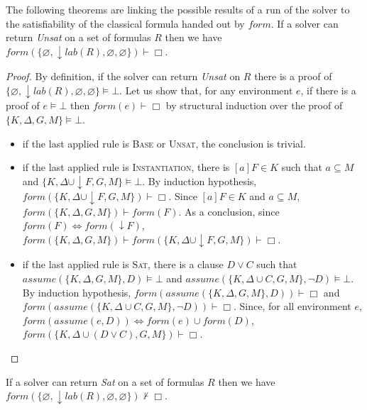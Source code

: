 \documentclass[a4paper,11pt]{article}
\newcommand{\F}{\mathit{form}}
\newcommand{\T}{\mathit{lab}}
\newcommand{\A}{\mathit{assume}}
\newcommand{\impbox}{\vDash\bot}
\begin{document}
The following theorems are linking the possible results of a run of the solver to the satisfiability
of the classical formula handed out by $\F$.
{\theorem\label{pred1} If a solver can return \emph{Unsat} on a set of formulas $R$ then we have
$\F(\{\varnothing,\downarrow\T(R),\varnothing,\varnothing\})\vdash\Box$.}
\begin{proof}
By definition, if the solver can return \emph{Unsat} on $R$ there is a proof of
$\{\varnothing,\downarrow\T(R),\varnothing,\varnothing\}\impbox$. Let us show that,
for any environment $e$, if there is a proof of $e\impbox$ then $\F(e)\vdash\Box$ by structural
induction over the proof of $\{K,\Delta,G,M\}\impbox$.
\begin{itemize}
 \item if the last applied rule is \textsc{Base} or \textsc{Unsat}, the conclusion is trivial.
 \item if the last applied rule is \textsc{Instantiation}, there is $[a]F\in K$ such that
$a\subseteq M$ and $\{K,\Delta\cup\downarrow F,G,M\}\impbox$. By induction hypothesis,
$\F(\{K,\Delta\cup\downarrow F,G,M\})\vdash\Box$. Since $[a]F\in K$ and $a\subseteq M$,
$\F(\{K,\Delta,G,M\})\vdash\F(F)$. As a conclusion, since $\F(F)\Leftrightarrow\F(\downarrow F)$,
$\F(\{K,\Delta,G,M\})\vdash\F(\{K,\Delta\cup\downarrow F,G,M\})\vdash\Box$.
 \item if the last applied rule is \textsc{Sat}, there is a clause $D\vee C$ such that
$\A(\{K,\Delta,G,M\},D)\impbox$ and $\A(\{K,\Delta\cup C,G,M\},\neg D)\impbox$.
By induction hypothesis, $\F(\A(\{K,\Delta,G,M\},D))\vdash\Box$ and
$\F(\A(\{K,\Delta\cup C,G,M\},\neg D))\vdash\Box$. Since, for all environment $e$,
$\F(\A(e,D))\Leftrightarrow\F(e)\cup\F(D)$,
$\F(\{K,\Delta\cup(D\vee C),G,M\})\vdash\Box$.
\end{itemize}
\end{proof}
{\theorem\label{pred2} If a solver can return \emph{Sat} on a set of formulas $R$ then we have
$\F(\{\varnothing,\downarrow\T(R),\varnothing,\varnothing\})\nvdash\Box$.}
\end{document}
